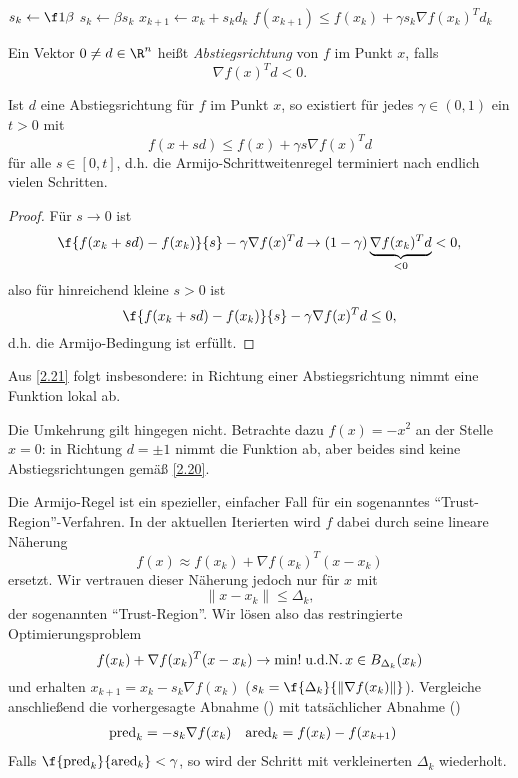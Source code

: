 \begin{alg}
	\begin{algorithmic}
		\State $s_k \gets \f 1{\beta}$
		\Repeat
			\State $s_k \gets \beta s_k$
			\State $x_{k+1} \gets x_k + s_k d_k$
		\Until $f(x_{k+1}) \le f(x_k) + \gamma s_k \nabla f(x_k)^T d_k$
	\end{algorithmic}
\end{alg}

\begin{df} \label{2.20}
	Ein Vektor $0 \neq d \in \R^n$ heißt \emph{Abstiegsrichtung} von $f$ im Punkt $x$, falls
	\[
		\nabla f(x)^T d < 0.
	\]
\end{df}

\begin{st} \label{2.21}
	Ist $d$ eine Abstiegsrichtung für $f$ im Punkt $x$, so existiert für jedes $\gamma \in (0,1)$ ein $t > 0$ mit
	\[
		f(x+sd)
		\le f(x) + \gamma s \nabla f(x)^T d
	\]
	für alle $s \in [0,t]$, d.h. die Armijo-Schrittweitenregel terminiert nach endlich vielen Schritten.
	\begin{proof}
		Für $s \to 0$ ist
		\[
			\f{f(x_k+sd)-f(x_k)}{s} - \gamma \nabla f(x)^T d
			\to (1 - \gamma) \underbrace{\nabla f(x_k)^T d}_{<0}
			< 0,
		\]
		also für hinreichend kleine $s>0$ ist
		\[
			\f{f(x_k+sd)-f(x_k)}{s} - \gamma \nabla f(x)^T d
			\le 0,
		\]
		d.h. die Armijo-Bedingung ist erfüllt.
	\end{proof}
\end{st}

\begin{ex} \label{2.22}
	Aus \ref{2.21} folgt insbesondere: in Richtung einer Abstiegsrichtung nimmt eine Funktion lokal ab.

	Die Umkehrung gilt hingegen nicht.
	Betrachte dazu $f(x) = -x^2$ an der Stelle $x = 0$: in Richtung $d=\pm 1$ nimmt die Funktion ab, aber beides sind keine Abstiegsrichtungen gemäß \ref{2.20}.
\end{ex}

\begin{nt} \label{2.23}
	Die Armijo-Regel ist ein spezieller, einfacher Fall für ein sogenanntes “Trust-Region”-Verfahren.
	In der aktuellen Iterierten wird $f$ dabei durch seine lineare Näherung
	\[
		f(x)
		\approx f(x_k) + \nabla f(x_k)^T (x-x_k)
	\]
	ersetzt.
	Wir vertrauen dieser Näherung jedoch nur für $x$ mit
	\[
		\|x - x_k\| \le \Delta_k,
	\]
	der sogenannten “Trust-Region”.
	Wir lösen also das restringierte Optimierungsproblem
	\[
		f(x_k) + \nabla f(x_k)^T (x-x_k) \to \min!
		\;\text{u.d.N.}\,
		x \in B_{\Delta_k}(x_k)
	\]
	und erhalten $x_{k+1} = x_k - s_k \nabla f(x_k)$ ($s_k = \f {\Delta_k}{\|\nabla f(x_k)\|}$).
	Vergleiche anschließend die vorhergesagte Abnahme (\pred) mit tatsächlicher Abnahme (\ared)
	\begin{align*}
		\text{pred}_k &= -s_k \nabla f(x_k) &
		\text{ared}_k &= f(x_k) - f(x_{k+1})
	\end{align*}
	Falls $\f {\pred_k}{\ared_k} < \gamma$, so wird der Schritt mit verkleinerten $\Delta_k$ wiederholt.
\end{nt}

